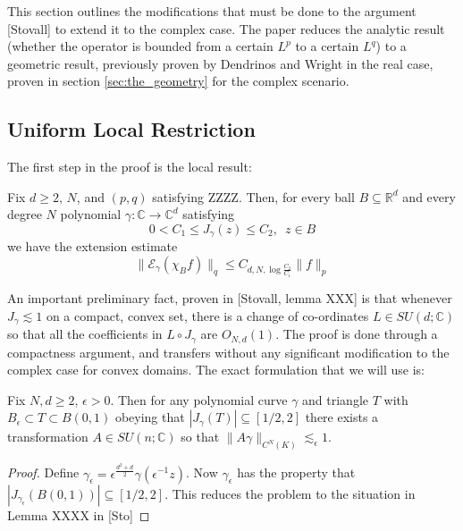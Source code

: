 	This section outlines the modifications that must be done to the argument [Stovall] to extend it to the complex case. The paper reduces the analytic result (whether the operator is bounded from a certain $L^p$ to a certain $L^q$) to a geometric result, previously proven by Dendrinos and Wright in the real case, proven in section \ref{sec:the_geometry} for the complex scenario.


	\subsection{Uniform Local Restriction} %
	\label{sub:uniform_local_restriction}
	
	The first step in the proof is the local result:

	\begin{thm}[Theorem 2.1 in {[Stovall]}]\label{thm:uniform_local_restriction}
	 	Fix $d\ge 2$, $N$, and $(p,q)$ satisfying ZZZZ. Then, for every ball $B\subseteq \mathbb R^d$ and every degree $N$ polynomial $\gamma: \mathbb C \to \mathbb C^d$ satisfying
	 	\begin{equation}
	 		0<C_1 \le J_\gamma(z) \le C_2, \,\,\, z \in B
	 	\end{equation}
	 	we have the extension estimate
	 	\begin{equation}
	 		\|\mathcal E_\gamma(\chi_B f)\|_q \le C_{d,N,\log {\frac {C_2}{C_1}}} \|f\|_p
	 	\end{equation}
	 \end{thm} 

	An important preliminary fact, proven in [Stovall, lemma XXX] is that whenever $J_\gamma \lesssim 1$ on a compact, convex set, there is a change of co-ordinates $L \in SU(d;\mathbb C)$ so that all the coefficients in $L\circ J_\gamma$ are $O_{N,d}(1)$. The proof is done through a compactness argument, and transfers without any significant modification to the complex case for convex domains. The exact formulation that we will use is:

	\begin{lemma}
		Fix $N,d \ge 2$, $\epsilon>0$. Then for any polynomial curve $\gamma$ and triangle $T$ with $B_\epsilon \subset T\subset  B(0,1)$  obeying that $|J_\gamma(T)|\subseteq [1/2, 2]$ there exists a transformation $A \in SU(n;\mathbb C)$ so that $\|A\gamma\|_{C^N(K)} \lesssim_\epsilon 1$.
	\end{lemma}

	\begin{proof}
		Define $\gamma_\epsilon = \epsilon^{\frac{d^2+d}{2}}\gamma(\epsilon^{-1} z)$. Now $\gamma_\epsilon$ has the property that $|J_{ \gamma_\epsilon}(B(0,1))|\subseteq [1/2, 2]$. This reduces the problem to the situation in Lemma XXXX in [Sto]
	\end{proof}





